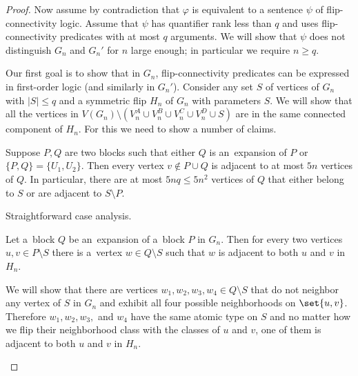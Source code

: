 \begin{proof}
    Now assume by contradiction that $\varphi$ is equivalent to a sentence $\psi$ of flip-connectivity logic.
    Assume that $\psi$ has quantifier rank less than $q$ and uses flip-connectivity predicates with at most $q$ arguments.
    We will show that $\psi$ does not distinguish $G_n$ and $G_n'$ for $n$ large enough; in particular we require $n \ge q$.

    Our first goal is to show that in $G_n$, flip-connectivity predicates can be expressed in first-order logic (and similarly in $G_n'$).
    Consider any set $S$ of vertices of $G_n$ with $|S| \leq q$ and a symmetric flip $H_n$ of $G_n$ with parameters $S$.
    We will show that all the vertices in $V(G_n) \setminus (V_n^A \cup V_n^B \cup V_n^C \cup V_n^D \cup S)$ are in the same connected component of $H_n$.
    For this we need to show a number of claims.

    \begin{claim}
        \label{cl:limited-adjacency}
        Suppose $P, Q$ are two blocks such that either $Q$ is an~expansion of $P$ or $\{P, Q\} = \{U_1, U_2\}$.
        Then every vertex $v \notin P \cup Q$ is adjacent to at most $5n$ vertices of $Q$.
        In particular, there are at most $5nq \leq 5n^2$ vertices of $Q$ that either belong to $S$ or are adjacent to $S \setminus P$.
    \end{claim}
    \begin{claimproof}
        Straightforward case analysis.
    \end{claimproof}

    \begin{claim}
        \label{cl:expansion-adjacency}
        Let a~block $Q$ be an~expansion of a~block $P$ in $G_n$.
        Then for every two vertices $u, v \in P \setminus S$ there is a~vertex $w \in Q \setminus S$ such that $w$ is adjacent to both $u$ and $v$ in $H_n$.
    \end{claim}
    \begin{claimproof}
        We will show that there are vertices $w_1, w_2, w_3, w_4 \in Q \setminus S$ that do not neighbor any vertex of $S$ in $G_n$ and exhibit all four possible neighborhoods on $\set{u, v}$.
        Therefore $w_1, w_2, w_3,$ and $w_4$ have the same atomic type on $S$ and no matter how we flip their neighborhood class with the classes of $u$ and $v$, one of them is adjacent to both $u$ and $v$ in $H_n$.


\end{claimproof}
\end{proof}
